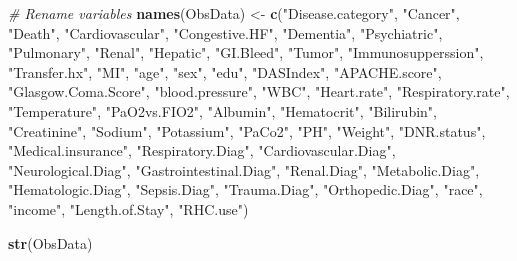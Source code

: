 \documentclass[
]{article}
\newenvironment{Shaded}{\begin{snugshade}}{\end{snugshade}}
\newcommand{\CommentTok}[1]{\textcolor[rgb]{0.56,0.35,0.01}{\textit{#1}}}
\newcommand{\FunctionTok}[1]{\textcolor[rgb]{0.13,0.29,0.53}{\textbf{#1}}}
\newcommand{\NormalTok}[1]{#1}
\newcommand{\OtherTok}[1]{\textcolor[rgb]{0.56,0.35,0.01}{#1}}
\newcommand{\StringTok}[1]{\textcolor[rgb]{0.31,0.60,0.02}{#1}}
\begin{document}
\begin{Shaded}
\begin{Highlighting}[]
\CommentTok{\# Rename variables}
\FunctionTok{names}\NormalTok{(ObsData) }\OtherTok{\textless{}{-}} \FunctionTok{c}\NormalTok{(}\StringTok{"Disease.category"}\NormalTok{, }\StringTok{"Cancer"}\NormalTok{, }\StringTok{"Death"}\NormalTok{, }\StringTok{"Cardiovascular"}\NormalTok{, }\StringTok{"Congestive.HF"}\NormalTok{, }
                    \StringTok{"Dementia"}\NormalTok{, }\StringTok{"Psychiatric"}\NormalTok{, }\StringTok{"Pulmonary"}\NormalTok{, }\StringTok{"Renal"}\NormalTok{, }\StringTok{"Hepatic"}\NormalTok{, }\StringTok{"GI.Bleed"}\NormalTok{, }
                    \StringTok{"Tumor"}\NormalTok{, }\StringTok{"Immunosupperssion"}\NormalTok{, }\StringTok{"Transfer.hx"}\NormalTok{, }\StringTok{"MI"}\NormalTok{, }\StringTok{"age"}\NormalTok{, }\StringTok{"sex"}\NormalTok{, }\StringTok{"edu"}\NormalTok{, }
                    \StringTok{"DASIndex"}\NormalTok{, }\StringTok{"APACHE.score"}\NormalTok{, }\StringTok{"Glasgow.Coma.Score"}\NormalTok{, }\StringTok{"blood.pressure"}\NormalTok{, }\StringTok{"WBC"}\NormalTok{, }
                    \StringTok{"Heart.rate"}\NormalTok{, }\StringTok{"Respiratory.rate"}\NormalTok{, }\StringTok{"Temperature"}\NormalTok{, }\StringTok{"PaO2vs.FIO2"}\NormalTok{, }\StringTok{"Albumin"}\NormalTok{, }
                    \StringTok{"Hematocrit"}\NormalTok{, }\StringTok{"Bilirubin"}\NormalTok{, }\StringTok{"Creatinine"}\NormalTok{, }\StringTok{"Sodium"}\NormalTok{, }\StringTok{"Potassium"}\NormalTok{, }\StringTok{"PaCo2"}\NormalTok{, }
                    \StringTok{"PH"}\NormalTok{, }\StringTok{"Weight"}\NormalTok{, }\StringTok{"DNR.status"}\NormalTok{, }\StringTok{"Medical.insurance"}\NormalTok{, }\StringTok{"Respiratory.Diag"}\NormalTok{, }
                    \StringTok{"Cardiovascular.Diag"}\NormalTok{, }\StringTok{"Neurological.Diag"}\NormalTok{, }\StringTok{"Gastrointestinal.Diag"}\NormalTok{, }
                    \StringTok{"Renal.Diag"}\NormalTok{, }\StringTok{"Metabolic.Diag"}\NormalTok{, }\StringTok{"Hematologic.Diag"}\NormalTok{, }\StringTok{"Sepsis.Diag"}\NormalTok{, }
                    \StringTok{"Trauma.Diag"}\NormalTok{, }\StringTok{"Orthopedic.Diag"}\NormalTok{, }\StringTok{"race"}\NormalTok{, }\StringTok{"income"}\NormalTok{, }\StringTok{"Length.of.Stay"}\NormalTok{, }
                    \StringTok{"RHC.use"}\NormalTok{)}

\FunctionTok{str}\NormalTok{(ObsData)}
\end{Highlighting}
\end{Shaded}
\end{document}
